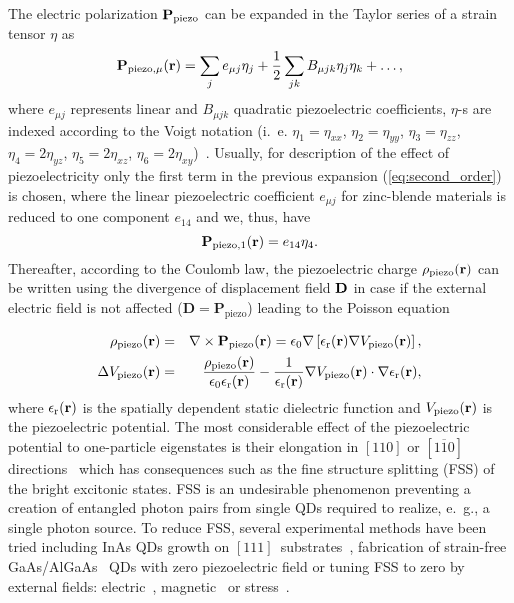 The electric polarization $\mathbf{P}_{{\rm piezo}}$ can be expanded in the Taylor series of a strain tensor $\eta$ as
\begin{equation}
\mathbf{P}_{{\rm piezo},\mu}(\mathbf{r})=%
\sum_je_{\mu j}\eta_j+\frac{1}{2}\sum_{jk}B_{\mu jk}\eta_j\eta_k+\dots ,\label{eq:second_order}
\end{equation}
where $e_{\mu j}$ represents linear and $B_{\mu jk}$ quadratic piezoelectric coefficients, $\eta$-s are indexed according to the Voigt notation (i.~e. $\eta_1=\eta_{xx}$, $\eta_2=\eta_{yy}$, $\eta_3=\eta_{zz}$, $\eta_4=2\eta_{yz}$, $\eta_5=2\eta_{xz}$, $\eta_6=2\eta_{xy}$)~\citep{voigt_notation, Beya-Wakata2011}. 
Usually, for description of the effect of piezoelectricity only the first term in the previous expansion (\ref{eq:second_order}) is chosen, where the linear piezoelectric coefficient $e_{\mu j}$ for zinc-blende materials is reduced to one component $e_{14}$ and we, thus, have
\begin{equation}
\mathbf{P}_{{\rm piezo},1}(\mathbf{r})=%
e_{14 }\eta_4 \label{eq:first_order}.
\end{equation}
%
Thereafter, according to the Coulomb law, the piezoelectric charge $\rho_{\rm piezo}(\bf{r})$ can be written using the divergence of displacement field $\bf{ D}$ in case if the external electric field is not affected ($\mathbf{D}=\mathbf{P}_\mathrm{piezo}$) leading to the Poisson equation

\begin{eqnarray}
\rho_{\rm piezo}(\mathbf{r})&=&\nabla\times\mathbf{P}_{\rm piezo}(\mathbf{r})=\epsilon_0\nabla\left[\epsilon_{\rm r}(\mathbf{r})\nabla V_{\rm piezo}(\mathbf{r})\right],\\
\Delta V_{\rm piezo}(\mathbf{r})&=&\frac{\rho_{\rm piezo}(\mathbf{r})}{\epsilon_0\epsilon_{\rm r}(\mathbf{r})}-\frac{1}{\epsilon_{\rm r}(\mathbf{r})}\nabla V_{\rm piezo}(\mathbf{r})\cdot\nabla\epsilon_{\rm r}(\mathbf{r}),
\end{eqnarray}
%
where $\epsilon_{\rm r}(\bf{r})$ is the spatially dependent static dielectric function and $V_{\rm piezo}(\bf{r})$ is the piezoelectric potential. The most considerable effect of the piezoelectric potential to one-particle eigenstates is their elongation in $[110]$ or $[1\overline{1}0]$ directions~\citep{Stier1999} which has consequences such as the fine structure splitting (FSS) of the bright excitonic states. FSS is an undesirable phenomenon preventing a creation of entangled photon pairs from single QDs required to realize, e.~g., a single photon source. To reduce FSS, several experimental methods have been tried including InAs QDs growth on $[111]$~substrates~\citep{StockFSS}, fabrication of strain-free GaAs/AlGaAs~\citep{Abbarchi_2008} QDs with zero piezoelectric field or tuning FSS to zero by external fields: electric~\citep{Gerardot_2007, Vogel_2007}, magnetic~\citep{Stevenson_2006} or stress~\citep{kleDresden}. 

